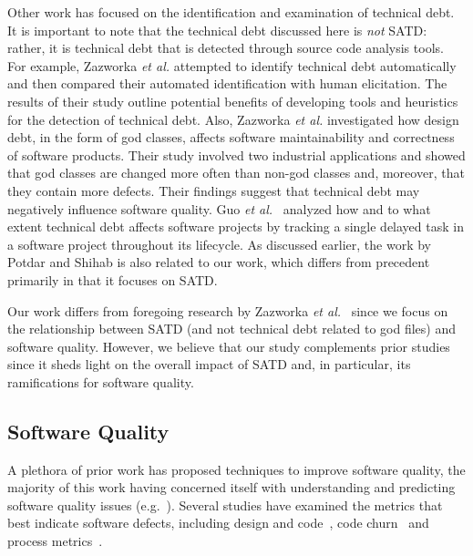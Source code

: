 Other work has focused on the identification and examination of technical debt. It is important to note that the technical debt discussed here is \emph{not} SATD: rather, it is technical debt that is detected through source code analysis tools. For example,  Zazworka {\em et al.} \cite{Zazworka:2013} attempted to identify technical debt automatically and then compared their automated identification with human elicitation. The results of their study outline potential benefits of developing tools and heuristics for the detection of technical debt. Also, Zazworka {\em et al.} \cite{zazworka2011investigating} investigated how design debt, in the form of god classes, affects software maintainability and correctness of software products. Their study involved two industrial applications and showed that god classes are changed more often than non-god classes and, moreover, that they contain more defects. Their findings suggest that technical debt may negatively influence software quality. Guo {\em et al.}~\cite{GuoSGCTSSS11} analyzed how and to what extent technical debt affects software projects by tracking a single delayed task in a software project throughout its lifecycle. As discussed earlier, the work by Potdar and Shihab \cite{ICSM_PotdarS14} is also related to our work, which differs from precedent primarily in that it focuses on SATD.


Our work differs from foregoing research by Zazworka {\em et al.}~\cite{zazworka2011investigating,Zazworka:2013} since we focus on the relationship between SATD (and not technical debt related to god files) and software quality. However, we believe that our study complements prior studies since it sheds light on the overall impact of SATD and, in particular, its ramifications for software quality.



\subsection{Software Quality}

A plethora of prior work has proposed techniques to improve software quality, the majority of this work having concerned itself with understanding and predicting software quality issues (e.g.~\cite{Zimmerman2008Springer}). Several studies have examined the metrics that best indicate software defects, including design and code~\cite{Jiang-promise-2008}, code churn~\cite{Nagappan-icse-2005} and process metrics~\cite{Moser-icse-2008,Rahman-icse-2013}.

